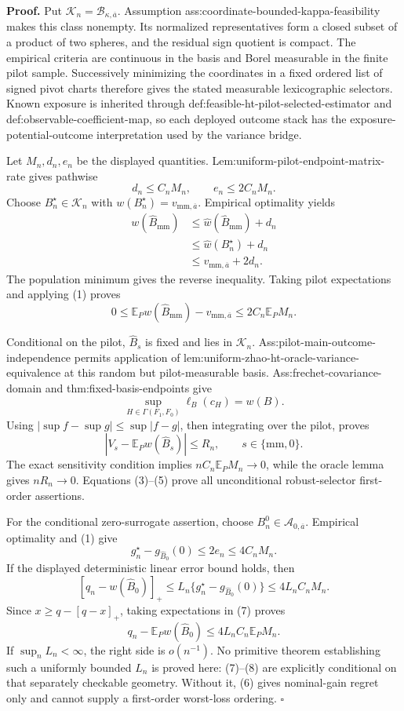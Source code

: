 \textbf{Proof.}
Put \(\mathcal K_n=\mathcal B_{\kappa,\overline a}\).  Assumption ass:coordinate-bounded-kappa-feasibility makes this class nonempty.  Its normalized representatives form a closed subset of a product of two spheres, and the residual sign quotient is compact.  The empirical criteria are continuous in the basis and Borel measurable in the finite pilot sample.  Successively minimizing the coordinates in a fixed ordered list of signed pivot charts therefore gives the stated measurable lexicographic selectors.  Known exposure is inherited through def:feasible-ht-pilot-selected-estimator and def:observable-coefficient-map, so each deployed outcome stack has the exposure-potential-outcome interpretation used by the variance bridge.

Let \(M_n,d_n,e_n\) be the displayed quantities.  Lem:uniform-pilot-endpoint-matrix-rate gives pathwise
\[
d_n\le C_nM_n,
\qquad e_n\le2C_nM_n.
\tag{1}
\]
Choose \(B_n^\star\in\mathcal K_n\) with \(w(B_n^\star)=v_{\mathrm{mm},\overline a}\).  Empirical optimality yields
\[
\begin{aligned}
w(\widehat B_{\mathrm{mm}})
&\le\widehat w(\widehat B_{\mathrm{mm}})+d_n\\
&\le\widehat w(B_n^\star)+d_n\\
&\le v_{\mathrm{mm},\overline a}+2d_n.
\end{aligned}
\tag{2}
\]
The population minimum gives the reverse inequality.  Taking pilot expectations and applying (1) proves
\[
0\le\mathbb E_Pw(\widehat B_{\mathrm{mm}})-v_{\mathrm{mm},\overline a}
\le2C_n\mathbb E_PM_n.
\tag{3}
\]

Conditional on the pilot, \(\widehat B_s\) is fixed and lies in \(\mathcal K_n\).  Ass:pilot-main-outcome-independence permits application of lem:uniform-zhao-ht-oracle-variance-equivalence at this random but pilot-measurable basis.  Ass:frechet-covariance-domain and thm:fixed-basis-endpoints give
\[
\sup_{H\in\Gamma(F_1,F_0)}\ell_B(c_H)=w(B).
\tag{4}
\]
Using \(|\sup f-\sup g|\le\sup|f-g|\), then integrating over the pilot, proves
\[
|V_s-\mathbb E_Pw(\widehat B_s)|\le R_n,
\qquad s\in\{\mathrm{mm},0\}.
\tag{5}
\]
The exact sensitivity condition implies \(nC_n\mathbb E_PM_n\to0\), while the oracle lemma gives \(nR_n\to0\).  Equations (3)--(5) prove all unconditional robust-selector first-order assertions.

For the conditional zero-surrogate assertion, choose \(B_n^0\in\mathcal A_{0,\overline a}\).  Empirical optimality and (1) give
\[
g_n^\star-g_{\widehat B_0}(0)\le2e_n\le4C_nM_n.
\tag{6}
\]
If the displayed deterministic linear error bound holds, then
\[
[q_n-w(\widehat B_0)]_+
\le L_n\{g_n^\star-g_{\widehat B_0}(0)\}
\le4L_nC_nM_n.
\tag{7}
\]
Since \(x\ge q-[q-x]_+\), taking expectations in (7) proves
\[
q_n-\mathbb E_Pw(\widehat B_0)
\le4L_nC_n\mathbb E_PM_n.
\tag{8}
\]
If \(\sup_nL_n<\infty\), the right side is \(o(n^{-1})\).  No primitive theorem establishing such a uniformly bounded \(L_n\) is proved here: (7)--(8) are explicitly conditional on that separately checkable geometry.  Without it, (6) gives nominal-gain regret only and cannot supply a first-order worst-loss ordering. \(\square\)